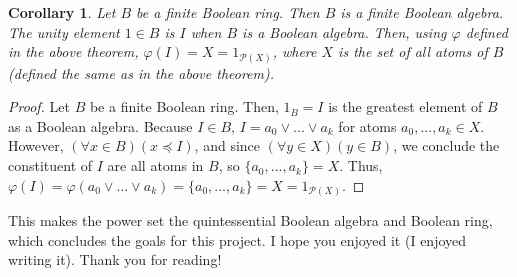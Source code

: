 \documentclass[10pt, letterpaper]{article}
\newcommand{\set}[1]{\{#1\}}
\newcommand{\powerset}[1]{\mathcal{P}(#1)}
\newtheorem{corollary}{Corollary}
\theoremstyle{definition}
\begin{document}
\begin{corollary}
	Let \(B\) be a finite Boolean ring. Then \(B\) is a finite Boolean algebra.
	The unity element \(1\in B\) is \(I\) when \(B\) is a Boolean algebra.
	Then, using \(\varphi\) defined in the above theorem,
	\(\varphi(I)=X=1_{\powerset{X}}\), where \(X\) is the set of all atoms of \(B\)
	(defined the same as in the above theorem).
\end{corollary}
\begin{proof}
	Let \(B\) be a finite Boolean ring. Then, \(1_B=I\) is the greatest element
	of \(B\) as a Boolean algebra. Because \(I\in B\),
	\(I=a_0\vee ...\vee a_k\) for atoms \(a_0,...,a_k\in X\).
	However, \((\forall x\in B)(x\preceq I)\), and since \((\forall y\in X)(y\in B)\),
	we conclude the constituent of \(I\) are all atoms in \(B\), so \(\set{a_0,...,a_k}=X\).
	Thus, \(\varphi(I)=\varphi(a_0\vee ...\vee a_k)=\set{a_0,...,a_k}=X=1_{\powerset{X}}\).
\end{proof}

This makes the power set the quintessential Boolean algebra and Boolean ring,
which concludes the goals for this project. I hope you enjoyed it
(I enjoyed writing it). Thank you for reading!
\end{document}
